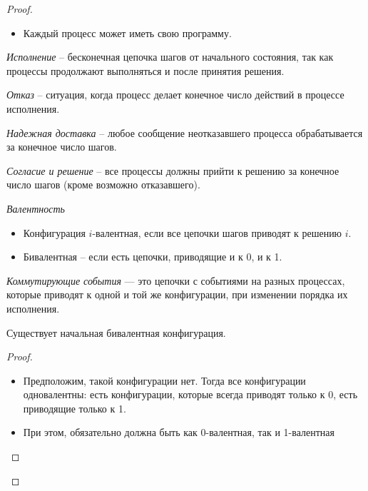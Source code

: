 \begin{proof}
\begin{itemize}
        \item Каждый процесс может иметь свою программу.
    \end{itemize}
    \begin{definition}
        \textit{Исполнение} -- бесконечная цепочка шагов от начального состояния, 
        так как процессы продолжают выполняться и после принятия решения.
    \end{definition}
    \begin{definition}
        \textit{Отказ} -- ситуация, когда процесс делает конечное число действий в процессе исполнения.
    \end{definition}
    \begin{definition}
        \textit{Надежная доставка} -- любое сообщение неотказавшего процесса 
        обрабатывается за конечное число шагов.
    \end{definition}
    \begin{definition}
        \textit{Согласие и решение} -- все процессы должны прийти к решению за 
        конечное число шагов (кроме возможно отказавшего).
    \end{definition}
    \begin{definition}
        \textit{Валентность}
        \begin{itemize}
            \item Конфигурация $i$-валентная, если все цепочки шагов приводят к решению $i$.
            \item Бивалентная -- если есть цепочки, приводящие и к 0, и к 1.
        \end{itemize}
    \end{definition}
    \begin{definition}
        \textit{Коммутирующие события} --- это цепочки с событиями на разных процессах, 
        которые приводят к одной и той же конфигурации, при изменении порядка их исполнения.
    \end{definition}
    \begin{lemma} 
        Существует начальная бивалентная конфигурация.
    \end{lemma}
    \begin{proof} 
        \begin{itemize}
            \item Предположим, такой конфигурации нет. Тогда все конфигурации одновалентны:
                есть конфигурации, которые всегда приводят только к 0, есть приводящие только к 1.
            \item При этом, обязательно должна быть как 0-валентная, так и 1-валентная

\end{itemize}
\end{proof}
\end{proof}
